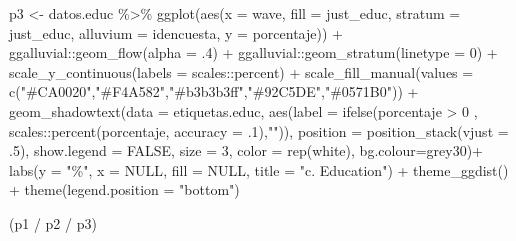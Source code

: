 \documentclass[
  12pt,
  letterpaper,
  DIV=11,
  numbers=noendperiod]{scrartcl}
\newenvironment{Shaded}{\begin{snugshade}}{\end{snugshade}}
\newcommand{\AttributeTok}[1]{\textcolor[rgb]{0.40,0.45,0.13}{#1}}
\newcommand{\ConstantTok}[1]{\textcolor[rgb]{0.56,0.35,0.01}{#1}}
\newcommand{\DecValTok}[1]{\textcolor[rgb]{0.68,0.00,0.00}{#1}}
\newcommand{\FunctionTok}[1]{\textcolor[rgb]{0.28,0.35,0.67}{#1}}
\newcommand{\NormalTok}[1]{\textcolor[rgb]{0.00,0.23,0.31}{#1}}
\newcommand{\OtherTok}[1]{\textcolor[rgb]{0.00,0.23,0.31}{#1}}
\newcommand{\SpecialCharTok}[1]{\textcolor[rgb]{0.37,0.37,0.37}{#1}}
\newcommand{\StringTok}[1]{\textcolor[rgb]{0.13,0.47,0.30}{#1}}
\begin{document}
\begin{Shaded}
\begin{Highlighting}[]
\NormalTok{p3 }\OtherTok{\textless{}{-}}\NormalTok{ datos.educ }\SpecialCharTok{\%\textgreater{}\%} 
  \FunctionTok{ggplot}\NormalTok{(}\FunctionTok{aes}\NormalTok{(}\AttributeTok{x =}\NormalTok{ wave, }\AttributeTok{fill =}\NormalTok{ just\_educ, }\AttributeTok{stratum =}\NormalTok{ just\_educ,}
             \AttributeTok{alluvium =}\NormalTok{ idencuesta, }\AttributeTok{y =}\NormalTok{ porcentaje)) }\SpecialCharTok{+}
\NormalTok{  ggalluvial}\SpecialCharTok{::}\FunctionTok{geom\_flow}\NormalTok{(}\AttributeTok{alpha =}\NormalTok{ .}\DecValTok{4}\NormalTok{) }\SpecialCharTok{+} 
\NormalTok{  ggalluvial}\SpecialCharTok{::}\FunctionTok{geom\_stratum}\NormalTok{(}\AttributeTok{linetype =} \DecValTok{0}\NormalTok{) }\SpecialCharTok{+}
  \FunctionTok{scale\_y\_continuous}\NormalTok{(}\AttributeTok{labels =}\NormalTok{ scales}\SpecialCharTok{::}\NormalTok{percent) }\SpecialCharTok{+} 
  \FunctionTok{scale\_fill\_manual}\NormalTok{(}\AttributeTok{values =}  \FunctionTok{c}\NormalTok{(}\StringTok{"\#CA0020"}\NormalTok{,}\StringTok{"\#F4A582"}\NormalTok{,}\StringTok{"\#b3b3b3ff"}\NormalTok{,}\StringTok{"\#92C5DE"}\NormalTok{,}\StringTok{"\#0571B0"}\NormalTok{)) }\SpecialCharTok{+}
  \FunctionTok{geom\_shadowtext}\NormalTok{(}\AttributeTok{data =}\NormalTok{ etiquetas.educ,}
                  \FunctionTok{aes}\NormalTok{(}\AttributeTok{label =} \FunctionTok{ifelse}\NormalTok{(porcentaje }\SpecialCharTok{\textgreater{}} \DecValTok{0}\NormalTok{ , scales}\SpecialCharTok{::}\FunctionTok{percent}\NormalTok{(porcentaje, }\AttributeTok{accuracy =}\NormalTok{ .}\DecValTok{1}\NormalTok{),}\StringTok{""}\NormalTok{)),}
                  \AttributeTok{position =} \FunctionTok{position\_stack}\NormalTok{(}\AttributeTok{vjust =}\NormalTok{ .}\DecValTok{5}\NormalTok{),}
                  \AttributeTok{show.legend =} \ConstantTok{FALSE}\NormalTok{,}
                  \AttributeTok{size =} \DecValTok{3}\NormalTok{,}
                  \AttributeTok{color =} \FunctionTok{rep}\NormalTok{(}\StringTok{\textquotesingle{}white\textquotesingle{}}\NormalTok{),}
                  \AttributeTok{bg.colour=}\StringTok{\textquotesingle{}grey30\textquotesingle{}}\NormalTok{)}\SpecialCharTok{+}
  \FunctionTok{labs}\NormalTok{(}\AttributeTok{y =} \StringTok{"\%"}\NormalTok{,}
       \AttributeTok{x =} \ConstantTok{NULL}\NormalTok{,}
       \AttributeTok{fill =} \ConstantTok{NULL}\NormalTok{,}
       \AttributeTok{title =} \StringTok{"c. Education"}\NormalTok{) }\SpecialCharTok{+}
  \FunctionTok{theme\_ggdist}\NormalTok{() }\SpecialCharTok{+}
  \FunctionTok{theme}\NormalTok{(}\AttributeTok{legend.position =} \StringTok{"bottom"}\NormalTok{) }

\NormalTok{(p1 }\SpecialCharTok{/}\NormalTok{ p2 }\SpecialCharTok{/}\NormalTok{ p3)}
\end{Highlighting}
\end{Shaded}
\end{document}
